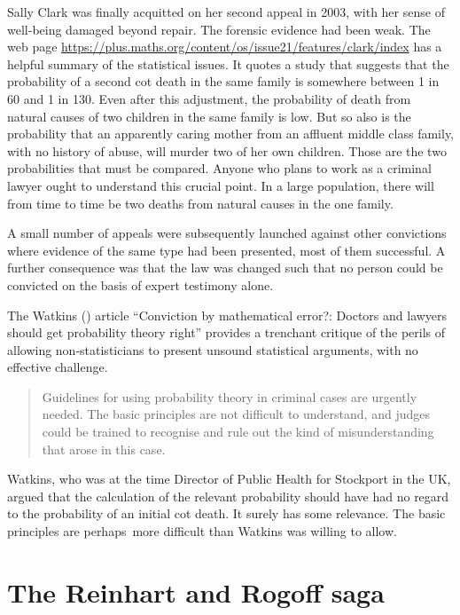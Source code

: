 \documentclass[
  10ptls,
  b5paper]{book}
\begin{document}
Sally Clark was finally acquitted on her second appeal in 2003, with her sense of well-being damaged beyond repair. The forensic evidence had been weak. The web page \url{https://plus.maths.org/content/os/issue21/features/clark/index} has a helpful summary of the statistical issues. It quotes a study that suggests that the probability of a second cot death in the same family is somewhere between 1 in 60 and 1 in 130. Even after this adjustment, the probability of death from natural causes of two children in the same family is low. But so also is the probability that an apparently caring mother from an affluent middle class family, with no history of abuse, will murder two of her own children. Those are the two probabilities that must be compared. Anyone who plans to work as a criminal lawyer ought to understand this crucial point. In a large population, there will from time to time be two deaths from natural causes in the one family.

A small number of appeals were subsequently launched against other convictions where evidence of the same type had been presented, most of them successful. A further consequence was that the law was changed such that no person could be convicted on the basis of expert testimony alone.

The Watkins () article ``Conviction by mathematical error?: Doctors and lawyers should get probability theory right'' provides a trenchant critique of the perils of allowing non-statisticians to present unsound statistical arguments, with no effective challenge.

\begin{quote}
Guidelines for using probability theory in criminal cases are urgently needed. The basic principles are not difficult to understand, and judges could be trained to recognise and rule out the kind of misunderstanding that arose in this case.
\end{quote}

Watkins, who was at the time Director of Public Health for Stockport in the UK, argued that the calculation of the relevant probability should have had no regard to the probability of an initial cot death. It surely has some relevance. The basic principles are perhaps~more difficult than Watkins was willing to allow.

\section{The Reinhart and Rogoff saga}\label{the-reinhart-and-rogoff-saga}
\end{document}
